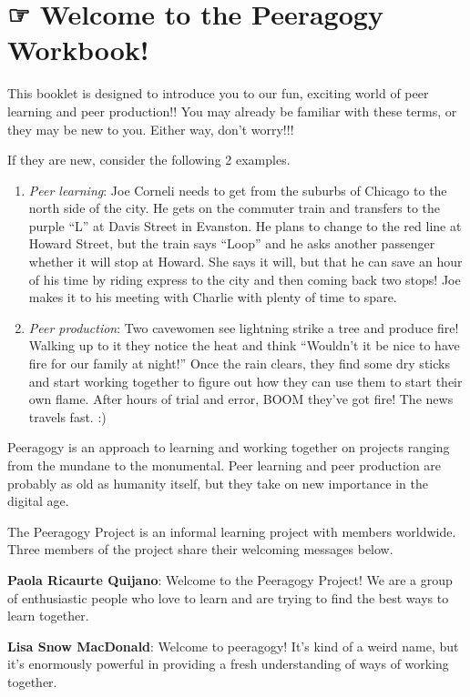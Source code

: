 \section{☞ Welcome to the Peeragogy
Workbook!}\label{welcome-to-the-peeragogy-workbook}

This booklet is designed to introduce you to our fun, exciting world of
peer learning and peer production!! You may already be familiar with
these terms, or they may be new to you. Either way, don't worry!!!

If they are new, consider the following 2 examples.

\begin{enumerate}
\def\labelenumi{\arabic{enumi}.}
\item
  \emph{Peer learning}: Joe Corneli needs to get from the suburbs of
  Chicago to the north side of the city. He gets on the commuter train
  and transfers to the purple ``L'' at Davis Street in Evanston. He
  plans to change to the red line at Howard Street, but the train says
  ``Loop'' and he asks another passenger whether it will stop at Howard.
  She says it will, but that he can save an hour of his time by riding
  express to the city and then coming back two stops! Joe makes it to
  his meeting with Charlie with plenty of time to spare.
\item
  \emph{Peer production}: Two cavewomen see lightning strike a tree and
  produce fire! Walking up to it they notice the heat and think
  ``Wouldn't it be nice to have fire for our family at night!'' Once the
  rain clears, they find some dry sticks and start working together to
  figure out how they can use them to start their own flame. After hours
  of trial and error, BOOM they've got fire! The news travels fast. :)
\end{enumerate}

Peeragogy is an approach to learning and working together on projects
ranging from the mundane to the monumental. Peer learning and peer
production are probably as old as humanity itself, but they take on new
importance in the digital age.

The Peeragogy Project is an informal learning project with members
worldwide. Three members of the project share their welcoming messages
below.

\textbf{Paola Ricaurte Quijano}: Welcome to the Peeragogy Project! We
are a group of enthusiastic people who love to learn and are trying to
find the best ways to learn together.

\textbf{Lisa Snow MacDonald}: Welcome to peeragogy! It's kind of a weird
name, but it's enormously powerful in providing a fresh understanding of
ways of working together.

